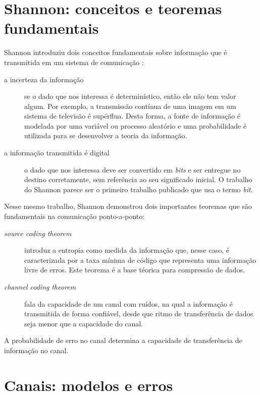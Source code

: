 
\section{Shannon: conceitos e teoremas fundamentais}

Shannon introduziu dois conceitos fundamentais sobre informação que é transmitida em um sistema de comunicação \cite{Yeung:2008}:

\begin{description}
   \item [a incerteza da informação] se o dado que nos interessa é determinístico, então ele não tem valor algum. Por exemplo, a transmissão contínua de uma imagem em um sistema de televisão é supérflua. Desta forma, a fonte de informação é modelada por uma variável ou processo aleatório e uma probabilidade é utilizada para se desenvolver a teoria da informação.
   \item [a informação transmitida é digital] o dado que nos interessa deve ser convertido em \emph{bits} e ser entregue no destino corretamente, sem referência ao seu significado inicial. O trabalho do Shannon \cite{Shannon:1948} parece ser o primeiro trabalho publicado que usa o termo \emph{bit}.
\end{description}

Nesse mesmo trabalho, Shannon demonstrou dois importantes teoremas que são fundamentais na comunicação ponto-a-ponto:

\begin{description}
   \item [\emph{source coding theorem}] introduz a entropia como medida da informação que, nesse caso, é caracterizada por a taxa mínima de código que representa uma informação livre de erros. Este teorema é a base téorica para compressão de dados.
   \item [\emph{channel coding theorem}] fala da capacidade de um canal com ruídos, na qual a informação é transmitida de forma confiável, desde que ritmo de transferência de dados seja menor que a capacidade do canal. 
\end{description}

A probabilidade de erro no canal determina a capacidade de transferência de informação no canal.

\section{Canais: modelos e erros} \label{canais}

